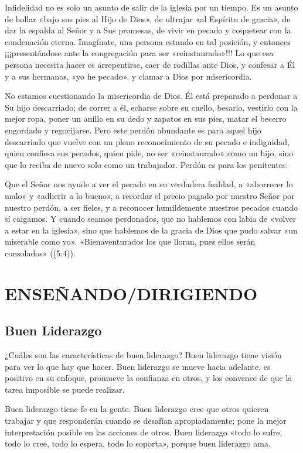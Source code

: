 \documentclass[12pt, twoside, openright]{book}
\begin{document}
Infidelidad no es solo un asunto de salir de la iglesia por un tiempo. Es un asunto de hollar «bajo sus pies al Hijo de Dios», de ultrajar «al Espíritu de gracia», de dar la espalda al Señor y a Sus promesas, de vivir en pecado y coquetear con la condenación eterna. Imagínate, una persona estando en tal posición, y entonces ¡¡¡presentándose ante la congregación para ser «reinstaurado»!!! Lo que esa persona necesita hacer es arrepentirse, caer de rodillas ante Dios, y confesar a Él y a sus hermanos, «yo he pecado», y clamar a Dios por misericordia. 

No estamos cuestionando la misericordia de Dios. Él está preparado a perdonar a Su hijo descarriado; de correr a él, echarse sobre su cuello, besarlo, vestirlo con la mejor ropa, poner un anillo en su dedo y zapatos en sus pies, matar el becerro engordado y regocijarse. Pero este perdón abundante es para aquel hijo descarriado que vuelve con un pleno reconocimiento de su pecado e indignidad, quien confiesa sus pecados, quien pide, no ser «reinstaurado» como un hijo, sino que lo reciba de nuevo solo como un trabajador. Perdón es para los penitentes. 

Que el Señor nos ayude a ver el pecado en su verdadera fealdad, a «aborrecer lo malo» y «adherir a lo bueno», a recordar el precio pagado por nuestro Señor por nuestro perdón, a ser fieles, y a reconocer humildemente nuestros pecados cuando sí caigamos. Y cuando seamos perdonados, que no hablemos con labia de «volver a estar en la iglesia», sino que hablemos de la gracia de Dios que pudo salvar «un miserable como yo».
«Bienaventurados los que lloran, pues ellos serán consolados» ((5:4)).

\chapter{ENSEÑANDO/DIRIGIENDO}

\section{Buen Liderazgo}
¿Cuáles son las características de buen liderazgo? Buen liderazgo tiene visión para ver lo que hay que hacer. Buen liderazgo se mueve hacia adelante, es positivo en su enfoque, promueve la confianza en otros, y los convence de que la tarea imposible se puede realizar.

Buen liderazgo tiene fe en la gente. Buen liderazgo cree que otros quieren trabajar y que responderán cuando se desafían apropiadamente; pone la mejor interpretación posible en las acciones de otros. Buen liderazgo «todo lo sufre, todo lo cree, todo lo espera, todo lo soporta», porque buen liderazgo ama.
\end{document}
